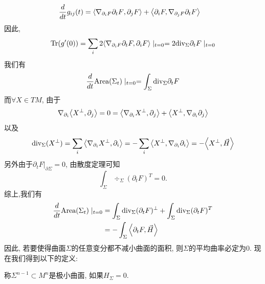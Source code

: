 \begin{equation}
    \begin{split}
        \frac{d}{dt} g_{ij}(t) & ={\left < \nabla_{\partial_i F}{\partial_tF}, \partial_jF \right >}+ {\left < \partial_iF, \nabla_{\partial_jF}\partial_tF \right >}
    \end{split}
\end{equation}
因此,
\begin{equation}
    \text{Tr}(g'(0))=\sum_i 2{\left < \nabla_{\partial_iF}\partial_tF, \partial_iF \right >} \mid_{t=0}=2{\text{div}}_\Sigma \partial_tF\mid_{t=0}
\end{equation}
我们有
\begin{equation}
    \frac{d}{dt} \text{Area}(\Sigma_t)\mid_{t=0}=\int_\Sigma {\text{div}}_\Sigma \partial_t F
\end{equation}
而$\forall X \in TM$, 由于
\begin{equation}
    \nabla_{\partial_i}{\left < X^\perp, \partial_j \right >}=0={\left < \nabla_{\partial_i}X^\perp, \partial_j \right >}+{\left < X^\perp, \nabla_{\partial_i}\partial_j \right >}
\end{equation}
以及 
\begin{equation}
    {\text{div}}_\Sigma(X^\perp)=\sum_i{\left < \nabla_{\partial_i}X^\perp, \partial_i \right >}=-\sum_i{\left < X^\perp, \nabla_{\partial_i}\partial_i \right >}=-{\left < X^\perp, \vec{H} \right >}
\end{equation}
另外由于$\partial_tF|_{\partial \Sigma}=0$, 由散度定理可知
\begin{equation}
        \int_\Sigma \div_{\Sigma}(\partial_tF)^T =0.
\end{equation}
综上,我们有
\begin{equation}
    \begin{split}
        \frac{d}{dt} \text{Area}(\Sigma_t)\mid_{t=0} & = \int_\Sigma {\text{div}}_{\Sigma}(\partial_tF)^\perp + \int_\Sigma {\text{div}}_{\Sigma}(\partial_tF)^T \\
        &=-\int_\Sigma{\left < \partial_tF, \vec{H} \right >}
    \end{split}
\end{equation}
因此, 若要使得曲面$\Sigma$的任意变分都不减小曲面的面积, 则$\Sigma$的平均曲率必定为0. 现在我们得到以下的定义:
\begin{definition}
    称$\Sigma^{n-1} \subset M^n$是极小曲面, 如果$H_\Sigma=0$.
\end{definition}

